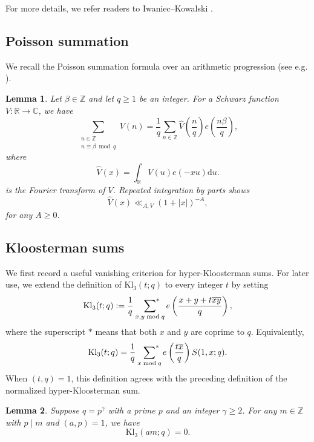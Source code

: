 \documentclass[11pt,reqno]{amsart}
\numberwithin{equation}{section}
\theoremstyle{plain}
\newtheorem{lemma}{Lemma}[section]
\theoremstyle{definition}
\newcommand{\Kl}{\mathrm{Kl}}
\begin{document}
For more details, we refer readers to Iwaniec--Kowalski \cite[Sections 5.1 \& 14.8]{IK}.
\subsection{Poisson summation}
We recall the Poisson summation formula over an arithmetic progression (see e.g. \cite[Eq.\,(4.24)]{IK}).

\begin{lemma}
Let $\beta\in \mathbb{Z}$ and let $q\geq 1$ be an integer.
For a Schwarz function $V:\mathbb{R}\rightarrow\mathbb{C}$, we have
\begin{equation*}\label{Poisson}
\sum_{\substack{n\in \mathbb{Z} \\ n \equiv \beta \bmod q}}V(n)
=\frac{1}{q}\sum_{n\in \mathbb{Z}}\widehat{V}\left(\frac{n}{q}\right)
e\left(\frac{n\beta}{q}\right),
\end{equation*}
where \begin{equation*}
\widehat{V}(x) = \int_{\mathbb{R}} V(u)e(-xu)\mathrm{d}u.
\end{equation*}
is the Fourier transform of $V$.
Repeated integration by parts shows 
\begin{equation*}\label{Vcheck}
\widehat{V}(x)\ll_{A,V} (1+|x|)^{-A},
\end{equation*}
for any $A\geq 0$.
\end{lemma}


\subsection{Kloosterman sums}\label{subsec:Kloosterman sum}
We first record a useful vanishing criterion for hyper-Kloosterman sums.
For later use, we extend the definition of \(\Kl_3(t;q)\)
to every integer \(t\) by setting
\[
\Kl_3(t;q)
:=\frac{1}{q}\,\,\,\sideset{}{^*}\sum_{x,y\bmod q}e\left(\frac{x+y+t\overline{xy}}{q}\right),
\]
where the superscript $*$ means that both \(x\) and \(y\)
are coprime to \(q\). Equivalently,
\[
\Kl_3(t;q)=\frac{1}{q}\,\,\,\sideset{}{^*}\sum_{x\bmod q}
e\left(\frac{t\overline{x}}{q}\right)S(1,x;q).
\]
When \((t,q)=1\), this definition agrees with the preceding
definition of the normalized hyper-Kloosterman sum.
\begin{lemma}\label{lem:Kloosterman=0-initial}
Suppose $q=p^\gamma$ with a prime $p$ and an integer  $\gamma\geqslant2$.
For any $m\in\mathbb{Z}$ with $p\mid m$ and $(a,p)=1$, we have
$$
\Kl_3(am;q)=0.
$$
\end{lemma}
\end{document}
